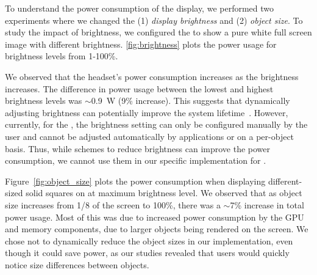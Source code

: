 %

To understand the power consumption of the display, we performed two experiments where we changed the
(1) \textit{display brightness} and (2) \textit{object size}. To study the impact of brightness, we configured the {\mlo} to show a pure white full screen image with different brightness. \fig\ref{fig:brightness} plots the power usage for brightness levels from 1-100\%. 

We observed that the headset's power consumption increases as the brightness increases. The 
difference in power usage between the lowest and highest brightness levels was $\sim$0.9~W (9\% increase). This suggests that dynamically adjusting
brightness can potentially improve the system lifetime~\cite{focus}.
%
However, currently, for the {\mlo}, the brightness setting can only be configured 
manually by the user and cannot be adjusted automatically by applications or on a per-object basis. Thus, while schemes to reduce brightness can improve the power consumption, we cannot use them in our specific implementation for {\mlo}.

%
%



Figure~\ref{fig:object_size} plots the power consumption when displaying 
different-sized solid squares on {\mlo} at maximum brightness level. We observed that as object size increases from 1/8 of the screen to 100\%, there was a $\sim$7\% increase in total power usage. Most of 
this was due to increased power consumption by the GPU and memory components, due to larger objects being rendered on the screen. We chose not to dynamically reduce the object sizes in our implementation, even though it could save power, as our studies revealed that users would quickly notice size differences between objects.


